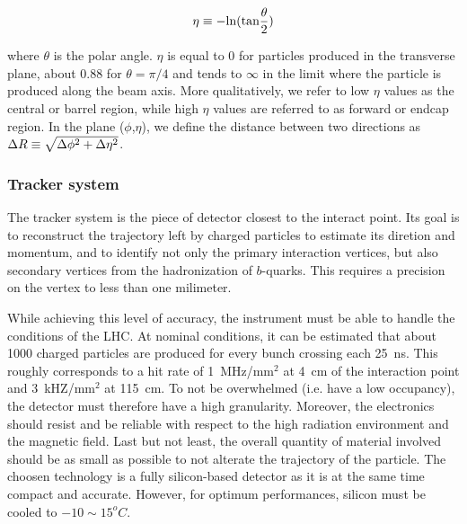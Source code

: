         $$ \eta \equiv - \text{ln}(\text{tan}\frac{\theta}{2}) $$

        where $\theta$ is the polar angle. $\eta$ is equal to 0 for particles produced in
        the transverse plane, about 0.88 for $\theta = \pi/4$ and tends to $\infty$ in the
        limit where the particle is produced along the beam axis. More qualitatively, we
        refer to low $\eta$ values as the central or barrel region, while high $\eta$ values
        are referred to as forward or endcap region. In the plane ($\phi$,$\eta$), we
        define the distance between two directions as $\Delta R \equiv \sqrt{\Delta
        \phi^2 + \Delta \eta^2}$.


            \subsubsection{Tracker system}

        The tracker system is the piece of detector closest to the interact point. Its goal
        is to reconstruct the trajectory left by charged particles to estimate its diretion
        and momentum, and to identify not only the primary interaction vertices, but also
        secondary vertices from the hadronization of $b$-quarks. This requires a precision
        on the vertex to less than one milimeter.

        While achieving this level of accuracy, the instrument must be able to handle the conditions of
        the LHC. At nominal conditions, it can be estimated that about 1000 charged particles
        are produced for every bunch crossing each 25~ns. This roughly corresponds to a
        hit rate of 1~MHz/mm$^2$ at 4~cm of the interaction point and 3~kHZ/mm$^2$ at 115~cm.
        To not be overwhelmed (i.e. have a low occupancy), the detector must therefore
        have a high granularity. Moreover, the electronics should resist and be reliable with
        respect to the high radiation environment and the magnetic field. Last but not
        least, the overall quantity of material involved should be as small as possible to
        not alterate the trajectory of the particle. The choosen technology is a fully
        silicon-based detector as it is at the same time compact and accurate. However,
        for optimum performances, silicon must be cooled to $-10\sim15^oC$.

